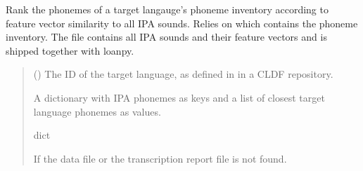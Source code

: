 \documentclass[letterpaper,10pt,english]{sphinxmanual}
\begin{document}
\begin{fulllineitems}
\label{\detokenize{documentation:loanpy.scminer.get_heur}}
\pysigstartsignatures
{}
\pysigstopsignatures
\sphinxAtStartPar
Rank the phonemes of a target langauge’s phoneme inventory according
to feature vector similarity to all IPA sounds.
Relies on  which contains the
phoneme inventory. The file  contains all IPA sounds
and their feature vectors and is shipped together with loanpy.
\begin{quote}\begin{description}
\sphinxAtStartPar
{} () \textendash{} The ID of the target language, as defined in
 in a CLDF repository.

\sphinxAtStartPar
A dictionary with IPA phonemes as keys and a list of
closest target language phonemes as values.

\sphinxAtStartPar
dict

\sphinxAtStartPar
{} \textendash{} If the data file or the transcription
report file is not found.

\end{description}\end{quote}

\sphinxAtStartPar
{}

\begin{sphinxVerbatim}[commandchars=\\\{\}]
   
\end{sphinxVerbatim}

\end{fulllineitems}
\end{document}
